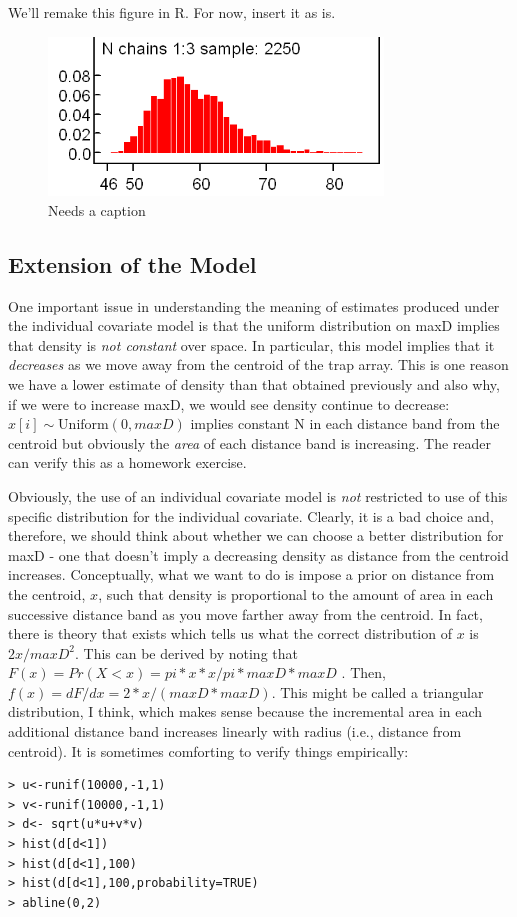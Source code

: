 We'll remake this figure in R.  For now, insert it as is.

\begin{figure}
\begin{center}
\includegraphics[width=3.5in]{Ch3/figs/Nchains}
\end{center}
\caption{Needs a caption}
\label{closed.fig.ha}
\end{figure}

\subsection{Extension of the Model}

One important issue in understanding the meaning of estimates produced under the individual covariate model  is that the uniform distribution on maxD implies that density is {\it not constant} over space. In particular, this model implies that it {\it decreases} as we move away from the centroid of the trap array. This is one reason we have a lower estimate of density than that obtained previously and also why, if we were to increase maxD, we would see density continue to decrease: $x[i] \sim \mbox{Uniform}(0,maxD)$ implies constant N in each distance band from the centroid but obviously the {\it area} of each distance band is increasing.  The reader can verify this as a homework exercise.

Obviously, the use of an individual covariate model is {\it not} restricted to use of this specific distribution for the individual covariate. Clearly, it is a bad choice and, therefore,  we should think about whether we can choose a better distribution for maxD - one that doesn't imply a decreasing density as distance from the centroid increases.  Conceptually, what we want to do is impose a prior on distance from the centroid, $x$, such that density is proportional to the amount of area in each successive distance band as you move farther away from the centroid.  In fact, there is theory that exists which tells us what the correct distribution of $x$ is $2x/maxD^2$. This can be derived by noting that $F(x) = Pr(X<x) = pi*x*x/pi*maxD*maxD$ . Then, $f(x) = dF/dx = 2*x/(maxD*maxD)$.  This might be called a triangular distribution, I think, which makes sense because the incremental area in each additional distance band increases linearly with radius (i.e., distance from centroid). It is sometimes comforting to verify things empirically:
\begin{verbatim}
> u<-runif(10000,-1,1)
> v<-runif(10000,-1,1)
> d<- sqrt(u*u+v*v)
> hist(d[d<1])
> hist(d[d<1],100)
> hist(d[d<1],100,probability=TRUE)
> abline(0,2)
\end{verbatim}


